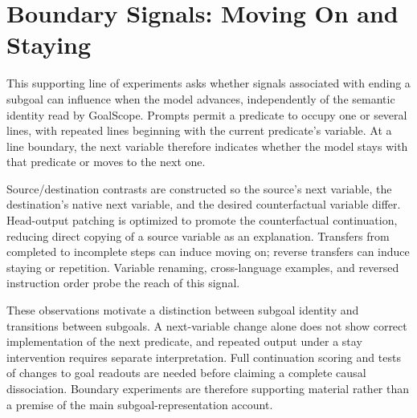 \section{Boundary Signals: Moving On and Staying}
\label{app:boundary}
This supporting line of experiments asks whether signals associated with ending a subgoal can influence when the model advances, independently of the semantic identity read by GoalScope. Prompts permit a predicate to occupy one or several lines, with repeated lines beginning with the current predicate's variable. At a line boundary, the next variable therefore indicates whether the model stays with that predicate or moves to the next one.

Source/destination contrasts are constructed so the source's next variable, the destination's native next variable, and the desired counterfactual variable differ. Head-output patching is optimized to promote the counterfactual continuation, reducing direct copying of a source variable as an explanation. Transfers from completed to incomplete steps can induce moving on; reverse transfers can induce staying or repetition. Variable renaming, cross-language examples, and reversed instruction order probe the reach of this signal.

These observations motivate a distinction between subgoal identity and transitions between subgoals. A next-variable change alone does not show correct implementation of the next predicate, and repeated output under a stay intervention requires separate interpretation. Full continuation scoring and tests of changes to goal readouts are needed before claiming a complete causal dissociation. Boundary experiments are therefore supporting material rather than a premise of the main subgoal-representation account.
